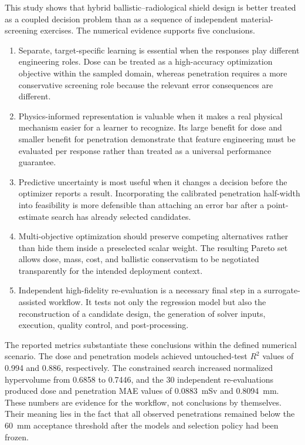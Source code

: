 \documentclass[12pt]{elsarticle}
\newcommand{\SI}[2]{#1~#2}
\begin{document}
	This study shows that hybrid ballistic--radiological shield design is better treated as a coupled decision problem than as a sequence of independent material-screening exercises. The numerical evidence supports five conclusions.
	\begin{enumerate}
		\item Separate, target-specific learning is essential when the responses play different engineering roles. Dose can be treated as a high-accuracy optimization objective within the sampled domain, whereas penetration requires a more conservative screening role because the relevant error consequences are different.
		\item Physics-informed representation is valuable when it makes a real physical mechanism easier for a learner to recognize. Its large benefit for dose and smaller benefit for penetration demonstrate that feature engineering must be evaluated per response rather than treated as a universal performance guarantee.
		\item Predictive uncertainty is most useful when it changes a decision before the optimizer reports a result. Incorporating the calibrated penetration half-width into feasibility is more defensible than attaching an error bar after a point-estimate search has already selected candidates.
		\item Multi-objective optimization should preserve competing alternatives rather than hide them inside a preselected scalar weight. The resulting Pareto set allows dose, mass, cost, and ballistic conservatism to be negotiated transparently for the intended deployment context.
		\item Independent high-fidelity re-evaluation is a necessary final step in a surrogate-assisted workflow. It tests not only the regression model but also the reconstruction of a candidate design, the generation of solver inputs, execution, quality control, and post-processing.
	\end{enumerate}

	The reported metrics substantiate these conclusions within the defined numerical scenario. The dose and penetration models achieved untouched-test $R^2$ values of 0.994 and 0.886, respectively. The constrained search increased normalized hypervolume from 0.6858 to 0.7446, and the 30 independent re-evaluations produced dose and penetration MAE values of \SI{0.0883}{mSv} and \SI{0.8094}{mm}. These numbers are evidence for the workflow, not conclusions by themselves. Their meaning lies in the fact that all observed penetrations remained below the \SI{60}{mm} acceptance threshold after the models and selection policy had been frozen.
\end{document}

